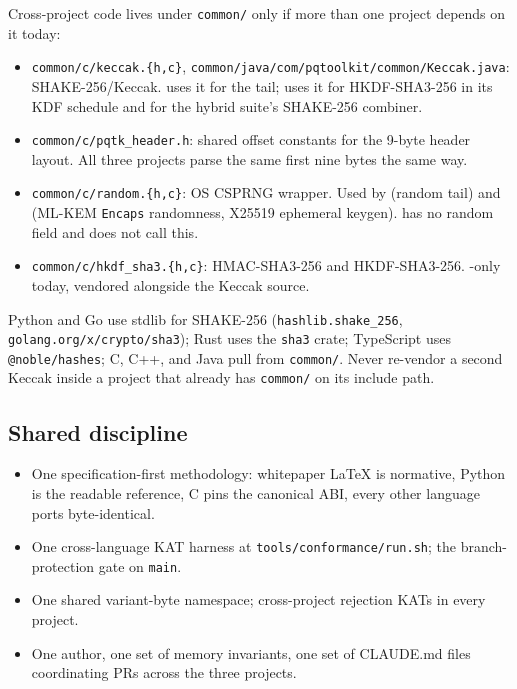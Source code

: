 Cross-project code lives under \texttt{common/} only if more than one project depends on it today:

\begin{itemize}
\item \texttt{common/c/keccak.\{h,c\}}, \texttt{common/java/com/pqtoolkit/common/Keccak.java}: SHAKE-256/Keccak. \pqhash{} uses it for the tail; \pqcrypt{} uses it for HKDF-SHA3-256 in its KDF schedule and for the hybrid suite's SHAKE-256 combiner.
\item \texttt{common/c/pqtk\_header.h}: shared offset constants for the 9-byte header layout. All three projects parse the same first nine bytes the same way.
\item \texttt{common/c/random.\{h,c\}}: OS CSPRNG wrapper. Used by \pqid{} (random tail) and \pqcrypt{} (ML-KEM \texttt{Encaps} randomness, X25519 ephemeral keygen). \pqhash{} has no random field and does not call this.
\item \texttt{common/c/hkdf\_sha3.\{h,c\}}: HMAC-SHA3-256 and HKDF-SHA3-256. \pqcrypt{}-only today, vendored alongside the Keccak source.
\end{itemize}

Python and Go use stdlib for SHAKE-256 (\texttt{hashlib.shake\_256}, \texttt{golang.org/x/crypto/sha3}); Rust uses the \texttt{sha3} crate; TypeScript uses \texttt{@noble/hashes}; C, C++, and Java pull from \texttt{common/}. Never re-vendor a second Keccak inside a project that already has \texttt{common/} on its include path.

\subsection{Shared discipline}

\begin{itemize}
\item One specification-first methodology: whitepaper LaTeX is normative, Python is the readable reference, C pins the canonical ABI, every other language ports byte-identical.
\item One cross-language KAT harness at \texttt{tools/conformance/run.sh}; the branch-protection gate on \texttt{main}.
\item One shared variant-byte namespace; cross-project rejection KATs in every project.
\item One author, one set of memory invariants, one set of CLAUDE.md files coordinating PRs across the three projects.
\end{itemize}

